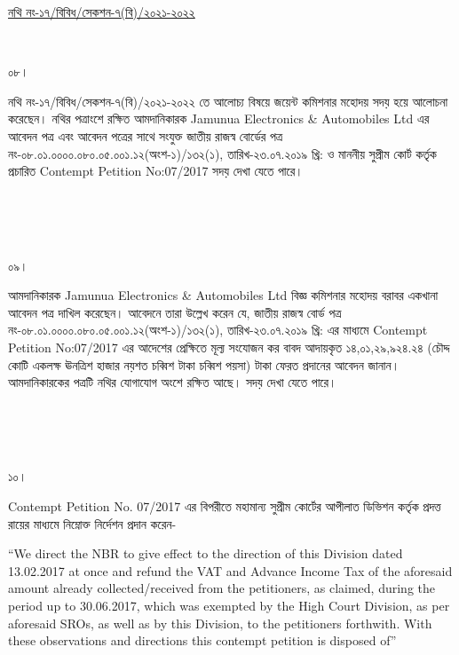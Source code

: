 \documentclass[12pt]{article}
\begin{document}
\begin{minipage}[t]{0.59\linewidth}
\hspace{0.5em}
\end{minipage}
\begin{minipage}[t]{1\textwidth}
\underline{নথি নং-১৭/বিবিধ/সেকশন-৭(বি)/২০২১-২০২২}
\end{minipage}
\\
\begin{minipage}[t]{0.05\linewidth}
০৮।
\end{minipage}
\begin{minipage}[t]{1\linewidth}
নথি নং-১৭/বিবিধ/সেকশন-৭(বি)/২০২১-২০২২
তে আলোচ্য বিষয়ে জয়েন্ট কমিশনার মহোদয়
সদয় হয়ে আলোচনা করেছেন।
নথির পত্রাংশে রক্ষিত আমদানিকারক
Jamunua Electronics \& Automobiles Ltd
এর আবেদন পত্র এবং আবেদন পত্রের সাথে সংযুক্ত
জাতীয় রাজস্ব বোর্ডের পত্র
নং-০৮.০১.০০০০.০৮০.০৫.০০১.১২(অংশ-১)/১৩২(১),
তারিখ-২৩.০৭.২০১৯ খ্রি:
ও মাননীয় সুপ্রীম কোর্ট কর্তৃক প্রচারিত
Contempt Petition No:07/2017
সদয় দেখা যেতে পারে।
\end{minipage}
\\
\\
\\
\begin{minipage}[t]{0.05\linewidth}
০৯।
\end{minipage}
\begin{minipage}[t]{1\linewidth}
আমদানিকারক
Jamunua Electronics \& Automobiles Ltd
বিজ্ঞ কমিশনার মহোদয় বরাবর
একখানা আবেদন পত্র দাখিল
করেছেন। আবেদনে তারা উল্লেখ করেন যে,
জাতীয় রাজস্ব বোর্ড পত্র
নং-০৮.০১.০০০০.০৮০.০৫.০০১.১২(অংশ-১)/১৩২(১),
তারিখ-২৩.০৭.২০১৯ খ্রি:
এর মাধ্যমে
Contempt Petition No:07/2017
এর আদেশের প্রেক্ষিতে মূল্য সংযোজন কর
বাবদ আদায়কৃত
১৪,০১,২৯,৯২৪.২৪
(চৌদ্দ কোটি একলক্ষ ঊনত্রিশ হাজার নয়শত চব্বিশ টাকা চব্বিশ পয়সা) টাকা
ফেরত প্রদানের আবেদন জানান।
আমদানিকারকের পত্রটি নথির যোগাযোগ
অংশে রক্ষিত আছে।
সদয় দেখা যেতে পারে।
\end{minipage}
\\
\\
\\
\begin{minipage}[t]{0.05\linewidth}
১০।
\end{minipage}
\begin{minipage}[t]{1\linewidth}
Contempt Petition No. 07/2017
এর বিপরীতে মহামান্য সুপ্রীম কোর্টের
আপীলাত ডিভিশন কর্তৃক প্রদত্ত রায়ের
মাধ্যমে নিম্নোক্ত নির্দেশন প্রদান করেন-


\hspace{1em}``We direct the NBR
to give effect to the direction
of this Division
dated 13.02.2017
at once and refund the VAT
and Advance Income Tax
of the aforesaid amount already
collected/received from the
petitioners, as claimed, during
the period up to 30.06.2017,
which was exempted by the
High Court Division, as per
aforesaid SROs, as well as by this
Division, to the  petitioners
forthwith. With these observations
and directions this contempt
petition is disposed of''
\end{minipage}
\end{document}
